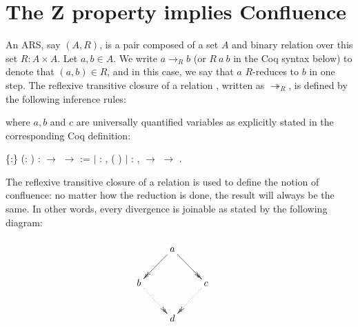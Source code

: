 \documentclass[a4paper]{article}
\newcommand{\tto}{\twoheadrightarrow}
\begin{document}
\section{The Z property implies Confluence}

An ARS, say $(A,R)$, is a pair composed of a set $A$ and binary
relation over this set $R:A\times A$. Let $a,b\in A$. We write
$a\to_R b$ (or $R\ a\ b$ in the Coq syntax below) to denote that
$(a,b)\in R$, and in this case, we say that $a$ $R$-reduces to $b$ in
one step. The reflexive transitive closure of a relation
, written as $\tto_R$, is defined by the following
inference rules:  \noindent where $a,b$ and $c$
are universally quantified variables as explicitly stated in the
corresponding Coq definition: \begin{coqdoccode} \coqdocemptyline
  \coqdocnoindent {} 
  \{:\} (: 
  ) :  \ensuremath{\rightarrow}
   \ensuremath{\rightarrow}  :=\coqdoceol
  \coqdocnoindent \ensuremath{|} :
  \coqdockw{\ensuremath{\forall}} ,
  ( ) 
  \coqdoceol \coqdocnoindent \ensuremath{|}
  : \coqdockw{\ensuremath{\forall}} 
   ,  
   \ensuremath{\rightarrow} 
     \ensuremath{\rightarrow}
    
  .\coqdoceol \coqdocemptyline
\end{coqdoccode}

The reflexive transitive closure of a relation is used to define
    the notion of confluence: no matter how the reduction is done, the
    result will always be the same. In other words, every divergence
    is joinable as stated by the following diagram:


    $\centerline{\xymatrix{ & a \ar@{->>}[dl] \ar@{->>}[dr] & \\ b
    \ar@{.>>}[dr] & & c \ar@{.>>}[dl] \\ & d & }}$
\end{document}
